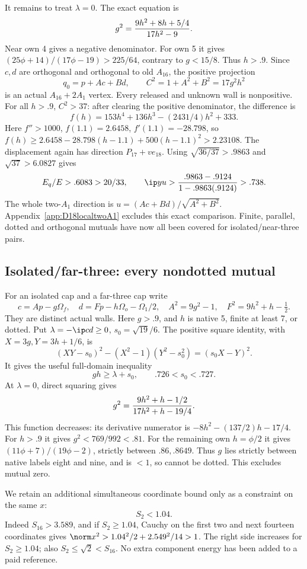It remains to treat \(\lambda=0\).
The exact equation is
\[
 g^2={9h^2+8h+5/4\over17h^2-9}.
\]
Near own 4 gives a negative denominator.
For own 5 it gives
\((25\phi+14)/(17\phi-19)>225/64\), contrary to \(g<15/8\).
Thus \(h>.9\).
Since \(c,d\) are orthogonal and orthogonal to old \(A_{16}\),
the positive projection
\[
 q_0=p+Ac+Bd,\qquad C^2=1+A^2+B^2=17g^2h^2
\]
is an actual \(A_{16}+2A_1\) vertex.
Every released and unknown wall is nonpositive.
For all \(h>.9\), \(C^2>37\):
after clearing the positive denominator, the difference is
\[
 f(h)=153h^4+136h^3-(2431/4)h^2+333.
\]
Here \(f''>1000\), \(f(1.1)=2.6458\), \(f'(1.1)=-28.798\),
so
\(f(h)\ge2.6458-28.798(h-1.1)+500(h-1.1)^2
>2.23108\).
The displacement again has direction \(P_{17}+ve_{18}\).
Using \(\sqrt{36/37}>.9863\) and \(\sqrt{37}>6.0827\)
gives
\[
 E_q/E>.6083>20/33,\qquad
 \ip yu>{.9863-.9124\over1-.9863(.9124)}>.738 .
\]
The whole two-\(A_1\) direction is
\(u=(Ac+Bd)/\sqrt{A^2+B^2}\).
Appendix~\ref{app:D18localtwoA1} excludes this exact comparison.
Finite, parallel, dotted and orthogonal mutuals have now all been
covered for isolated/near-three pairs.

\subsection{Isolated/far-three: every nondotted mutual}
\label{app:D18isolatedfarfinite}

For an isolated cap and a far-three cap write
\[
 c=Ap-g\Omega_f,\quad
 d=Fp-h\Omega_o-\Omega_1/2,\quad
 A^2=9g^2-1,\quad F^2=9h^2+h-\tfrac12 .
\]
They are distinct actual walls.  Here \(g>.9\), and \(h\) is
native 5, finite at least 7, or dotted.
Put \(\lambda=-\ip cd\ge0\), \(s_0=\sqrt{19}/6\).
The positive square identity, with
\(X=3g,Y=3h+1/6\), is
\[
 (XY-s_0)^2-(X^2-1)(Y^2-s_0^2)=(s_0X-Y)^2 .
\]
It gives the useful full-domain inequality
\[
                       gh\ge\lambda+s_0,\qquad
                       .726<s_0<.727.
\tag{DIFproduct}\label{eq:DIFproduct}
\]
At \(\lambda=0\), direct squaring gives
\[
 g^2={9h^2+h-1/2\over17h^2+h-19/4}.
\]
This function decreases: its derivative numerator is
\(-8h^2-(137/2)h-17/4\).
For \(h>.9\) it gives \(g^2<769/992<.81\).
For the remaining own \(h=\phi/2\) it gives
\((11\phi+7)/(19\phi-2)\), strictly between \(.86,.8649\).
Thus \(g\) lies strictly between native labels eight and nine,
and is \(<1\), so cannot be dotted.  This excludes mutual zero.

We retain an additional simultaneous coordinate bound only as a
constraint on the same \(x\):
\[
                            S_2<1.04 .
\tag{DIFS2}\label{eq:DIFS2}
\]
Indeed \(S_{16}>3.589\), and if \(S_2\ge1.04\), Cauchy on
the first two and next fourteen coordinates gives
\(\norm x^2>1.04^2/2+2.549^2/14>1\).
The right side increases for \(S_2\ge1.04\);
also \(S_2\le\sqrt2<S_{16}\).
No extra component energy has been added to a paid reference.

